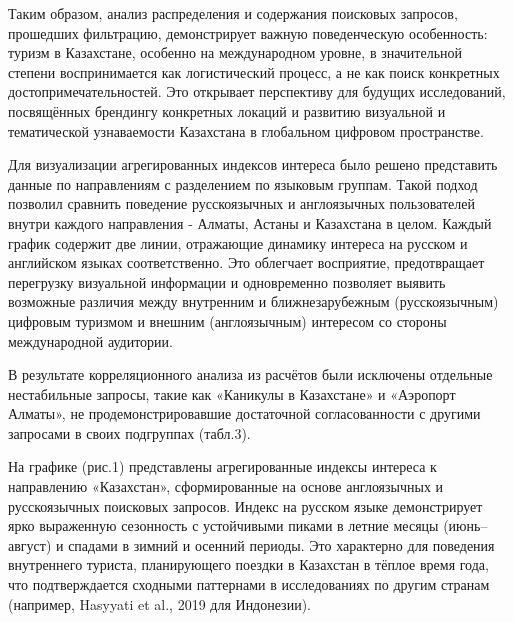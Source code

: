 \begin{multicols}{2}
Таким образом, анализ распределения и содержания поисковых запросов,
прошедших фильтрацию, демонстрирует важную поведенческую особенность:
туризм в Казахстане, особенно на международном уровне, в значительной
степени воспринимается как логистический процесс, а не как поиск
конкретных достопримечательностей. Это открывает перспективу для будущих
исследований, посвящённых брендингу конкретных локаций и развитию
визуальной и тематической узнаваемости Казахстана в глобальном цифровом
пространстве.

Для визуализации агрегированных индексов интереса было решено
представить данные по направлениям с разделением по языковым группам.
Такой подход позволил сравнить поведение русскоязычных и англоязычных
пользователей внутри каждого направления - Алматы, Астаны и Казахстана в
целом. Каждый график содержит две линии, отражающие динамику интереса на
русском и английском языках соответственно. Это облегчает восприятие,
предотвращает перегрузку визуальной информации и одновременно позволяет
выявить возможные различия между внутренним и ближнезарубежным
(русскоязычным) цифровым туризмом и внешним (англоязычным) интересом со
стороны международной аудитории.

В результате корреляционного анализа из расчётов были исключены
отдельные нестабильные запросы, такие как «Каникулы в Казахстане» и
«Аэропорт Алматы», не продемонстрировавшие достаточной согласованности с
другими запросами в своих подгруппах (табл.3).

На графике (рис.1) представлены агрегированные индексы интереса к
направлению «Казахстан», сформированные на основе англоязычных и
русскоязычных поисковых запросов. Индекс на русском языке демонстрирует
ярко выраженную сезонность с устойчивыми пиками в летние месяцы
(июнь--август) и спадами в зимний и осенний периоды. Это характерно для
поведения внутреннего туриста, планирующего поездки в Казахстан в тёплое
время года, что подтверждается сходными паттернами в исследованиях по
другим странам (например, Hasyyati et al., 2019 для Индонезии).
\end{multicols}

